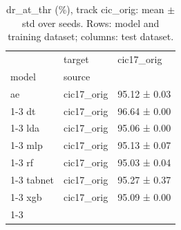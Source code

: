 \begin{table}
\caption{dr_at_thr (\%), track cic_orig: mean $\pm$ std over seeds. Rows: model and training dataset; columns: test dataset.}
\label{tab:matrix_cic_orig_dr_at_thr}
\begin{tabular}{lll}
\toprule
 & target & cic17_orig \\
model & source &  \\
\midrule
ae & cic17_orig & 95.12 ± 0.03 \\
\cline{1-3}
dt & cic17_orig & 96.64 ± 0.00 \\
\cline{1-3}
lda & cic17_orig & 95.06 ± 0.00 \\
\cline{1-3}
mlp & cic17_orig & 95.13 ± 0.07 \\
\cline{1-3}
rf & cic17_orig & 95.03 ± 0.04 \\
\cline{1-3}
tabnet & cic17_orig & 95.27 ± 0.37 \\
\cline{1-3}
xgb & cic17_orig & 95.09 ± 0.00 \\
\cline{1-3}
\bottomrule
\end{tabular}
\end{table}
